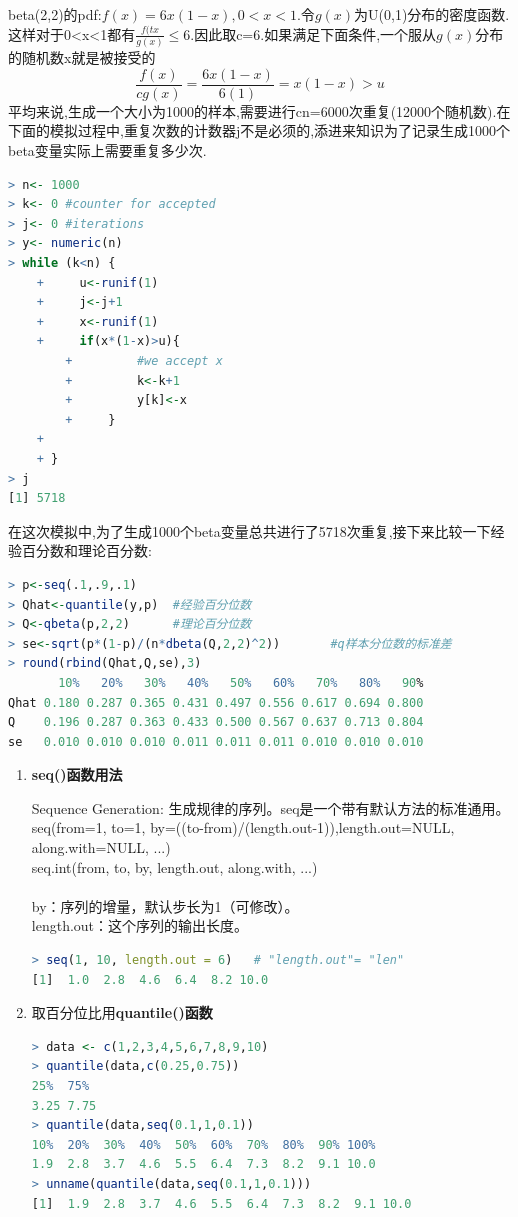 \documentclass[11pt,a4paper,oneside]{book}
\begin{document}
beta(2,2)的pdf:$ f(x)=6x(1-x) ,0<x<1$.令$ g(x) $为U(0,1)分布的密度函数.这样对于0<x<1都有$ \frac{f(tx}{g(x)}\leq 6 $.因此取c=6.如果满足下面条件,一个服从$ g(x) $分布的随机数x就是被接受的
\begin{equation}
\frac{f(x)}{cg(x)}=\frac{6x(1-x)}{6(1)}=x(1-x)>u
\end{equation}
平均来说,生成一个大小为1000的样本,需要进行cn=6000次重复(12000个随机数).在下面的模拟过程中,重复次数的计数器j不是必须的,添进来知识为了记录生成1000个beta变量实际上需要重复多少次.
\begin{lstlisting}[language=r]
> n<- 1000
> k<- 0 #counter for accepted
> j<- 0 #iterations
> y<- numeric(n)
> while (k<n) {
	+     u<-runif(1)
	+     j<-j+1
	+     x<-runif(1)
	+     if(x*(1-x)>u){
		+         #we accept x
		+         k<-k+1
		+         y[k]<-x
		+     }
	+     
	+ }
> j
[1] 5718
\end{lstlisting}
在这次模拟中,为了生成1000个beta变量总共进行了5718次重复,接下来比较一下经验百分数和理论百分数:
\begin{lstlisting}[language=r]
> p<-seq(.1,.9,.1)
> Qhat<-quantile(y,p)  #经验百分位数
> Q<-qbeta(p,2,2)      #理论百分位数
> se<-sqrt(p*(1-p)/(n*dbeta(Q,2,2)^2))       #q样本分位数的标准差
> round(rbind(Qhat,Q,se),3)
       10%   20%   30%   40%   50%   60%   70%   80%   90%
Qhat 0.180 0.287 0.365 0.431 0.497 0.556 0.617 0.694 0.800
Q    0.196 0.287 0.363 0.433 0.500 0.567 0.637 0.713 0.804
se   0.010 0.010 0.010 0.011 0.011 0.011 0.010 0.010 0.010
\end{lstlisting}
\begin{tcolorbox}[colback=pink!10!white,colframe=pink!100!black]
\begin{enumerate}
	\item \textbf{seq()函数用法}
	
	Sequence Generation: 生成规律的序列。seq是一个带有默认方法的标准通用。\\
	seq(from=1, to=1, by=((to-from)/(length.out-1)),length.out=NULL, along.with=NULL, ...)\\
	seq.int(from, to, by, length.out, along.with, ...)\\
	\\
	by：序列的增量，默认步长为1（可修改）。\\
	length.out：这个序列的输出长度。
\begin{lstlisting}[language=r]
> seq(1, 10, length.out = 6)   # "length.out"= "len"
[1]  1.0  2.8  4.6  6.4  8.2 10.0
\end{lstlisting}
	\item 取百分位比用\textbf{quantile()函数}
\begin{lstlisting}[language=r]
> data <- c(1,2,3,4,5,6,7,8,9,10)
> quantile(data,c(0.25,0.75))
25%  75% 
3.25 7.75 
> quantile(data,seq(0.1,1,0.1))
10%  20%  30%  40%  50%  60%  70%  80%  90% 100% 
1.9  2.8  3.7  4.6  5.5  6.4  7.3  8.2  9.1 10.0 
> unname(quantile(data,seq(0.1,1,0.1)))
[1]  1.9  2.8  3.7  4.6  5.5  6.4  7.3  8.2  9.1 10.0
\end{lstlisting}
\end{enumerate}
\end{tcolorbox}
\end{document}
